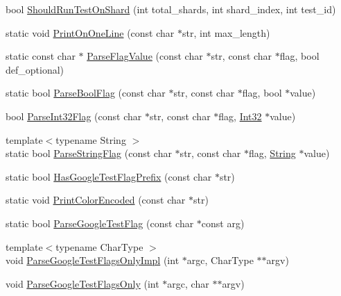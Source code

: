 \begin{DoxyCompactItemize}
bool \mbox{\hyperlink{namespacetesting_1_1internal_a437bd89f5bc532778d7467600e210395}{Should\+Run\+Test\+On\+Shard}} (int total\+\_\+shards, int shard\+\_\+index, int test\+\_\+id)
\item 
static void \mbox{\hyperlink{namespacetesting_1_1internal_a4a8708bfb808411f9d918c7356ae7362}{Print\+On\+One\+Line}} (const char $\ast$str, int max\+\_\+length)
\item 
static const char $\ast$ \mbox{\hyperlink{namespacetesting_1_1internal_a5edcf72ec43ec016efaf2500bca6c5d4}{Parse\+Flag\+Value}} (const char $\ast$str, const char $\ast$flag, bool def\+\_\+optional)
\item 
static bool \mbox{\hyperlink{namespacetesting_1_1internal_ac76619e6bb184bb1df258b08bc77cb6b}{Parse\+Bool\+Flag}} (const char $\ast$str, const char $\ast$flag, bool $\ast$value)
\item 
bool \mbox{\hyperlink{namespacetesting_1_1internal_ae3449e173767750b613114ceac6d916a}{Parse\+Int32\+Flag}} (const char $\ast$str, const char $\ast$flag, \mbox{\hyperlink{namespacetesting_1_1internal_a8ee38faaf875f133358abaf9bc056cec}{Int32}} $\ast$value)
\item 
{\footnotesize template$<$typename String $>$ }\\static bool \mbox{\hyperlink{namespacetesting_1_1internal_a3bb3b2eefe90e1e70b4787c51fa376b5}{Parse\+String\+Flag}} (const char $\ast$str, const char $\ast$flag, \mbox{\hyperlink{classtesting_1_1internal_1_1String}{String}} $\ast$value)
\item 
static bool \mbox{\hyperlink{namespacetesting_1_1internal_a6fff795269f50673e358438721710d6f}{Has\+Google\+Test\+Flag\+Prefix}} (const char $\ast$str)
\item 
static void \mbox{\hyperlink{namespacetesting_1_1internal_a7d8c446a29c7e22d7d4dde8f530bb57e}{Print\+Color\+Encoded}} (const char $\ast$str)
\item 
static bool \mbox{\hyperlink{namespacetesting_1_1internal_a2f8556fdd6cfeb81e799a8ae2fcc3566}{Parse\+Google\+Test\+Flag}} (const char $\ast$const arg)
\item 
{\footnotesize template$<$typename Char\+Type $>$ }\\void \mbox{\hyperlink{namespacetesting_1_1internal_ae4c46ce8c3d016848fff52cc5133f2ac}{Parse\+Google\+Test\+Flags\+Only\+Impl}} (int $\ast$argc, Char\+Type $\ast$$\ast$argv)
\item 
void \mbox{\hyperlink{namespacetesting_1_1internal_a472880afbcc592a41e3d623e2dec8412}{Parse\+Google\+Test\+Flags\+Only}} (int $\ast$argc, char $\ast$$\ast$argv)

\end{DoxyCompactItemize}

